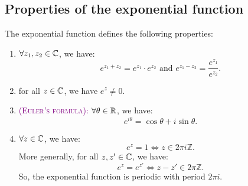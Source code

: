 \subsection{Properties of the exponential function}
\begin{proposition}[]
The exponential function defines the following properties:
\begin{enumerate}
  \item[\ding{172}] $\forall z_1, z_2 \in   \mathbb{C}$, we have:
    \[
    e^{z_1 + z_2} = e^{z_1} \cdot  e^{z_2} 
    \text{  and  }  
    e^{z_1 - z_2} = \frac{e^{z_1}}{e^{z_2}}.
    \]
  \item[\ding{173}] for all $z \in   \mathbb{C}  $, we have $e^{z} \neq  0$. 
  \item[\ding{174}] \textcolor{purple}{\textsc{(Euler's formula):} } $\forall  \theta \in   \mathbb{R}$, we have:
     \[
     e^{i\theta} = \cos \theta + i \sin \theta    .
     \]
   \item[\ding{175}] $\forall  z \in  \mathbb{C}  $, we have: 
     \[
     e^{z} = 1 \iff z \in  2 \pi i \mathbb{Z}.
     \]
     More generally, for all $z, z' \in  \mathbb{C}$, we have: 
     \[
     e^{z} = e^{z'} \iff z - z' \in  2 \pi  \mathbb{Z}.
     \]
     So, the exponential function is periodic with period $2 \pi  i $.
\end{enumerate}
\end{proposition}
